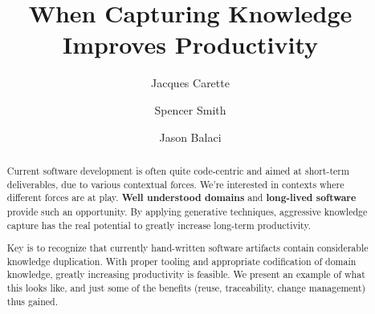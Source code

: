 \documentclass[sigconf,review,anonymous=false]{acmart}
\begin{document}

\title{When Capturing Knowledge Improves Productivity}

\author{Jacques Carette}

\author{Spencer Smith}

\author{Jason Balaci}

\begin{abstract}
  Current software development is often quite code-centric and aimed at
  short-term deliverables, due to various contextual forces. We're interested in
  contexts where different forces are at play.  \textbf{Well understood domains}
  and \textbf{long-lived software} provide such an opportunity. By
  applying generative techniques, aggressive knowledge capture has the real
  potential to greatly increase long-term productivity.

  Key is to recognize that currently hand-written software artifacts contain
  considerable knowledge duplication. With proper tooling and appropriate
  codification of domain knowledge, greatly increasing productivity is
  feasible. We present an example of what this looks like, and just some of
  the benefits (reuse, traceability, change management) thus gained.
\end{abstract}
\end{document}
